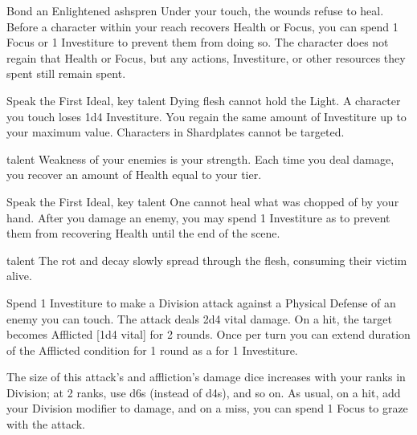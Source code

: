 		{Bond an Enlightened ashspren}
		{\iconSpecial}
		{Under your touch, the wounds refuse to heal.}
		{Before a character within your reach recovers Health or Focus, you can spend 1 Focus or 1 Investiture to prevent them from doing so. The character does not regain that Health or Focus, but any actions, Investiture, or other resources they spent still remain spent.}
	
\newpage
\talent{\talentDustbringerDrainName}
		{Speak the First Ideal, \talentDustbringerDecayName{} key talent}
		{\iconActionDouble}
		{Dying flesh cannot hold the Light.}
		{A character you touch loses 1d4 Investiture. You regain the same amount of Investiture up to your maximum value. Characters in Shardplates cannot be targeted.}
		
\talent{\talentDustbringerLifestealName}
		{\talentDustbringerDrainName{} talent}
		{\iconConstant}
		{Weakness of your enemies is your strength.}
		{Each time you deal damage, you recover an amount of Health equal to your tier.}
		
\talent{\talentDustbringerUnhealableName}
		{Speak the First Ideal, \talentDustbringerDecayName{} key talent}
		{\iconAction}
		{One cannot heal what was chopped of by your hand.}
		{After you damage an enemy, you may spend 1 Investiture as \iconAction{} to prevent them from recovering Health until the end of the scene.}
		
\talent{\talentDustbringerAfflictionName}
		{\talentDustbringerUnhealableName{} talent}
		{\iconAction}
		{The rot and decay slowly spread through the flesh, consuming their victim alive.}
		{Spend 1 Investiture to make a Division attack against a Physical Defense of an enemy you can touch. The attack deals 2d4 vital damage. On a hit, the target becomes Afflicted [1d4 vital] for 2 rounds. Once per turn you can extend duration of the Afflicted condition for 1 round as a \iconFreeAction{} for 1 Investiture.

		The size of this attack’s and affliction's damage dice increases with your ranks in Division; at 2 ranks,  use d6s (instead of d4s), and so on. As usual, on a hit, add your Division modifier to damage, and on a miss, you can spend 1 Focus to graze with the attack.}
		
		
